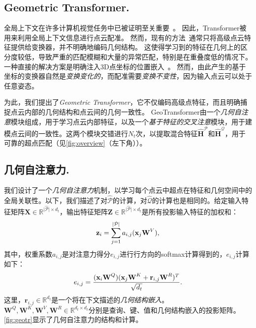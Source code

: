 

\subsection{Geometric Transformer.}
%
全局上下文在许多计算机视觉任务中已被证明至关重要~\cite{dosovitskiy2020image,sun2021loftr,yu2021cofinet}。
因此，Transformer被用来利用全局上下文信息进行点云配准。
然而，现有的方法~\cite{wang2019deep,huang2021predator,yu2021cofinet}通常只将高级点云特征提供给变换器，并不明确地编码几何结构。
这使得学习到的特征在几何上的区分度较低，导致严重的匹配模糊和大量的异常匹配，特别是在重叠度低的情况下。
一种直接的解决方案是明确注入3D点坐标的位置嵌入~\cite{yang2019modeling,zhao2021point}。
然而，由此产生的基于坐标的变换器自然是\emph{变换变化的}，而配准需要\emph{变换不变性}，因为输入点云可以处于任意姿态。

为此，我们提出了\emph{Geometric Transformer}，它不仅编码高级点特征，而且明确捕捉点云内部的几何结构和点云间的几何一致性。
GeoTransformer由一个\emph{几何自注意}模块组成，用于学习点云内部特征，以及一个\emph{基于特征的交叉注意}模块，用于建模点云间的一致性。这两个模块交错进行$N_t$次，以提取混合特征$\hat{\textbf{H}}^{\mathcal{P}}$和$\hat{\textbf{H}}^{\mathcal{Q}}$，用于可靠的超点匹配（见\ref{fig:overview}（左下角））。

\subsection{几何自注意力.}
%
我们设计了一个\emph{几何自注意力}机制，以学习每个点云中超点在特征和几何空间中的全局关联性。以下，我们描述了对$\hat{\mathcal{P}}$的计算，对$\hat{\mathcal{Q}}$的计算也是相同的。给定输入特征矩阵$\textbf{X} \in \mathbb{R}^{\lvert \hat{\mathcal{P}} \vert \times d_t}$，输出特征矩阵$\textbf{Z} \in \mathbb{R}^{\lvert \hat{\mathcal{P}} \vert \times d_t}$是所有投影输入特征的加权和：
\vspace{-5pt}
\begin{equation}
\textbf{z}_i = \sum_{j=1}^{\lvert \hat{\mathcal{P}} \vert} a_{i, j} (\textbf{x}_j\textbf{W}^V),
\vspace{-5pt}
\end{equation}
其中，权重系数$a_{i, j}$是对注意力得分$e_{i, j}$进行行方向的softmax计算得到的，$e_{i, j}$计算如下：
\vspace{-5pt}
\begin{equation}
e_{i, j} = \frac{(\textbf{x}_i\textbf{W}^Q)(\textbf{x}_j\textbf{W}^K + \textbf{r}_{i, j}\textbf{W}^R)^T}{\sqrt{d_{t}}}.
\vspace{-5pt}
\end{equation}
这里，$\textbf{r}_{i, j} \in \mathbb{R}^{d_t}$是一个将在下文描述的\emph{几何结构嵌入}。$\textbf{W}^Q, \textbf{W}^K, \textbf{W}^V, \textbf{W}^R \in \mathbb{R}^{d_t \times d_t}$分别是查询、键、值和几何结构嵌入的投影矩阵。\ref{fig:geotr}显示了几何自注意力的结构和计算。

